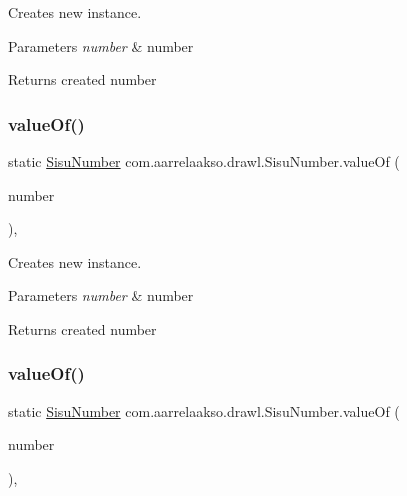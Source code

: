 Creates new instance. 


\begin{DoxyParams}{Parameters}
{\em number} & number \\
\hline
\end{DoxyParams}
\begin{DoxyReturn}{Returns}
created number 
\end{DoxyReturn}
\mbox{\label{classcom_1_1aarrelaakso_1_1drawl_1_1_sisu_number_ad12beb94319a712de494e2710620031f}} 
\subsubsection{\texorpdfstring{value\+Of()}{valueOf()}\hspace{0.1cm}{\footnotesize\ttfamily [3/4]}}
{\footnotesize\ttfamily static \hyperlink{classcom_1_1aarrelaakso_1_1drawl_1_1_sisu_number}{Sisu\+Number} com.\+aarrelaakso.\+drawl.\+Sisu\+Number.\+value\+Of (\begin{DoxyParamCaption}\item[{@Not\+Null final Big\+Decimal}]{number }\end{DoxyParamCaption})\hspace{0.3cm}{\ttfamily [static]}, {\ttfamily [protected]}}



Creates new instance. 


\begin{DoxyParams}{Parameters}
{\em number} & number \\
\hline
\end{DoxyParams}
\begin{DoxyReturn}{Returns}
created number 
\end{DoxyReturn}
\mbox{\label{classcom_1_1aarrelaakso_1_1drawl_1_1_sisu_number_aff49a9d0e8fa7aa03b45a15ee2365bb6}} 
\subsubsection{\texorpdfstring{value\+Of()}{valueOf()}\hspace{0.1cm}{\footnotesize\ttfamily [4/4]}}
{\footnotesize\ttfamily static \hyperlink{classcom_1_1aarrelaakso_1_1drawl_1_1_sisu_number}{Sisu\+Number} com.\+aarrelaakso.\+drawl.\+Sisu\+Number.\+value\+Of (\begin{DoxyParamCaption}\item[{final Integer}]{number }\end{DoxyParamCaption})\hspace{0.3cm}{\ttfamily [static]}, {\ttfamily [protected]}}



